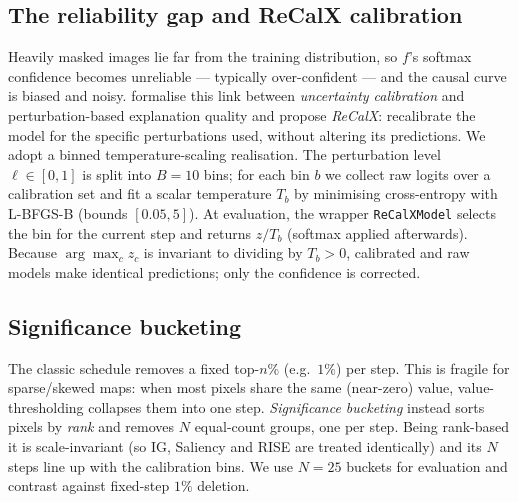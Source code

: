 \documentclass[11pt]{article}
\begin{document}
\subsection{The reliability gap and ReCalX calibration}
Heavily masked images lie far from the training distribution, so $f$'s softmax
confidence becomes unreliable --- typically over-confident --- and the causal
curve is biased and noisy. \citet{recalx2025} formalise this link between
\emph{uncertainty calibration} and perturbation-based explanation quality and
propose \emph{ReCalX}: recalibrate the model for the specific perturbations used,
without altering its predictions. We adopt a binned temperature-scaling
realisation. The perturbation level $\ell\in[0,1]$ is split into $B{=}10$ bins;
for each bin $b$ we collect raw logits over a calibration set and fit a scalar
temperature $T_b$ by minimising cross-entropy with L-BFGS-B (bounds
$[0.05,5]$). At evaluation, the wrapper \texttt{ReCalXModel} selects the bin for
the current step and returns $z/T_b$ (softmax applied afterwards). Because
$\arg\max_c z_c$ is invariant to dividing by $T_b>0$, calibrated and raw models
make identical predictions; only the confidence is corrected.

\subsection{Significance bucketing}
The classic schedule removes a fixed top-$n\%$ (e.g.\ $1\%$) per step. This is
fragile for sparse/skewed maps: when most pixels share the same (near-zero)
value, value-thresholding collapses them into one step. \emph{Significance
bucketing} instead sorts pixels by \emph{rank} and removes $N$ equal-count
groups, one per step. Being rank-based it is scale-invariant (so IG, Saliency
and RISE are treated identically) and its $N$ steps line up with the calibration
bins. We use $N{=}25$ buckets for evaluation and contrast against fixed-step
$1\%$ deletion.
\end{document}
